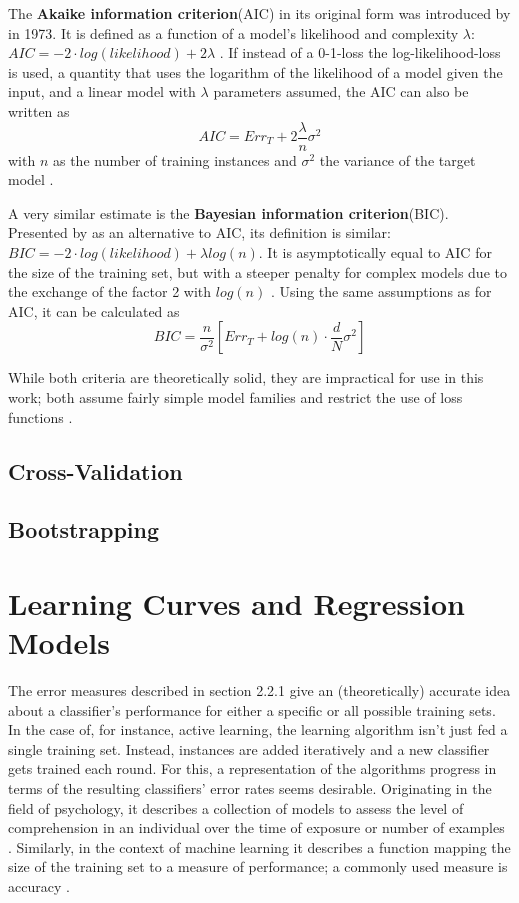 The \textbf{Akaike information criterion}(AIC) in its original form was introduced by \cite{Akaike1998} in 1973. It is defined as a function of a model's likelihood and complexity $\lambda$: $AIC = -2 \cdot log(likelihood) + 2\lambda$ \cite{Bozdogan1987}. If instead of a 0-1-loss the log-likelihood-loss is used, a quantity that uses the logarithm of the likelihood of a model given the input, and a linear model with $\lambda$ parameters assumed, the AIC can also be written as
\begin{equation}
AIC = Err_T + 2\frac{\lambda}{n}\sigma^2
\end{equation}
with $n$ as the number of training instances and $\sigma^2$ the variance of the target model \cite{HastieEtAl2009}.

A very similar estimate is the \textbf{Bayesian information criterion}(BIC). Presented by \cite{Schwarz1978} as an alternative to AIC, its definition is similar: $BIC = -2 \cdot log(likelihood) + \lambda log(n)$. It is asymptotically equal to AIC for the size of the training set, but with a steeper penalty for complex models due to the exchange of the factor 2 with $log(n)$ \cite{Weakliem1999}. Using the same assumptions as for AIC, it can be calculated as
\begin{equation}
BIC = \frac{n}{\sigma^2}[Err_T + log(n) \cdot \frac{d}{N}\sigma^2]
\end{equation}

While both criteria are theoretically solid, they are impractical for use in this work; both assume fairly simple model families and restrict the use of loss functions \cite{HastieEtAl2009}.

\subsection{Cross-Validation}

\subsection{Bootstrapping}

\section{Learning Curves and Regression Models}
The error measures described in section 2.2.1 give an (theoretically) accurate idea about a classifier's performance for either a specific or all possible training sets. In the case of, for instance, active learning, the learning algorithm isn't just fed a single training set. Instead, instances are added iteratively and a new classifier gets trained each round. For this, a representation of the algorithms progress in terms of the resulting classifiers' error rates seems desirable. Originating in the field of psychology, it describes a collection of models to assess the level of comprehension in an individual over the time of exposure or number of examples \cite{Yelle1979}. Similarly, in the context of machine learning it describes a function mapping the size of the training set to a measure of performance; a commonly used measure is accuracy \cite{PerlichEtAl2003}.

